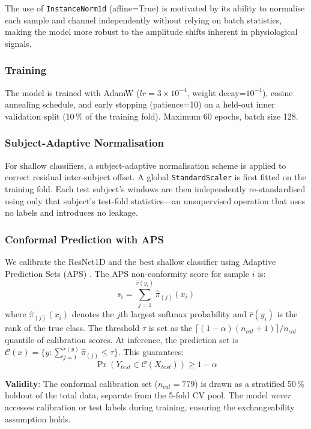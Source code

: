 \documentclass[conference]{IEEEtran}
\begin{document}
The use of \texttt{InstanceNorm1d} (affine=True) is motivated by its ability to normalise each sample and channel independently without relying on batch statistics, making the model more robust to the amplitude shifts inherent in physiological signals.

\subsubsection{Training}

The model is trained with AdamW ($lr=3\times10^{-4}$, weight decay=$10^{-4}$), cosine annealing schedule, and early stopping (patience=10) on a held-out inner validation split (10\,\% of the training fold). Maximum 60 epochs, batch size 128.

\subsubsection{Subject-Adaptive Normalisation}

For shallow classifiers, a subject-adaptive normalisation scheme is applied to correct residual inter-subject offset. A global \texttt{StandardScaler} is first fitted on the training fold. Each test subject's windows are then independently re-standardised using only that subject's test-fold statistics---an unsupervised operation that uses no labels and introduces no leakage.

\subsubsection{Conformal Prediction with APS}

We calibrate the ResNet1D and the best shallow classifier using Adaptive Prediction Sets (APS) \cite{romano2020classification}. The APS non-conformity score for sample $i$ is:
\[
s_i = \sum_{j=1}^{\hat{r}(y_i)} \hat{\pi}_{(j)}(x_i)
\]
where $\hat{\pi}_{(j)}(x_i)$ denotes the $j$th largest softmax probability and $\hat{r}(y_i)$ is the rank of the true class. The threshold $\tau$ is set as the $\lceil(1-\alpha)(n_{cal}+1)\rceil/n_{cal}$ quantile of calibration scores. At inference, the prediction set is $\mathcal{C}(x) = \{y : \sum_{j=1}^{r(y)} \hat{\pi}_{(j)} \leq \tau\}$. This guarantees:
\[
\Pr(Y_{test} \in \mathcal{C}(X_{test})) \geq 1 - \alpha
\]

\textbf{Validity}: The conformal calibration set ($n_{cal}=779$) is drawn as a stratified 50\,\% holdout of the total data, separate from the 5-fold CV pool. The model \emph{never} accesses calibration or test labels during training, ensuring the exchangeability assumption holds.
\end{document}
